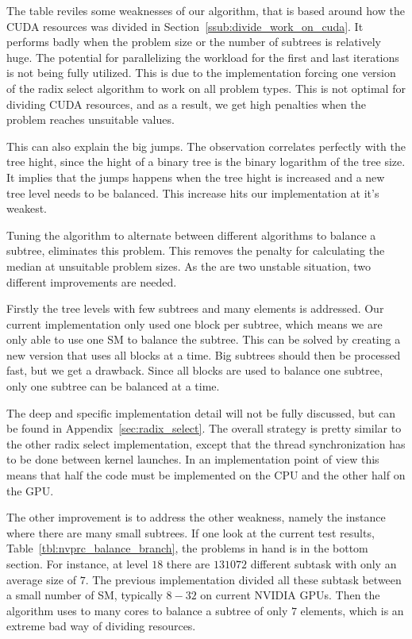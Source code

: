 The table reviles some weaknesses of our algorithm, that is based around how the CUDA resources was divided in Section~\ref{ssub:divide_work_on_cuda}. It performs badly when the problem size or the number of subtrees is relatively huge. The potential for parallelizing the workload for the first and last iterations is not being fully utilized. This is due to the implementation forcing one version of the radix select algorithm to work on all problem types. This is not optimal for dividing CUDA resources, and as a result, we get high penalties when the problem reaches unsuitable values.

This can also explain the big jumps. The observation correlates perfectly with the tree hight, since the hight of a binary tree is the binary logarithm of the tree size. It implies that the jumps happens when the tree hight is increased and a new tree level needs to be balanced. This increase hits our implementation at it's weakest.

Tuning the algorithm to alternate between different algorithms to balance a subtree, eliminates this problem. This removes the penalty for calculating the median at unsuitable problem sizes. As the are two unstable situation, two different improvements are needed.

Firstly the tree levels with few subtrees and many elements is addressed. Our current implementation only used one block per subtree, which means we are only able to use one SM to balance the subtree. This can be solved by creating a new version that uses all blocks at a time. Big subtrees should then be processed fast, but we get a drawback. Since all blocks are used to balance one subtree, only one subtree can be balanced at a time.

The deep and specific implementation detail will not be fully discussed, but can be found in Appendix~\ref{sec:radix_select}. The overall strategy is pretty similar to the other radix select implementation, except that the thread synchronization has to be done between kernel launches. In an implementation point of view this means that half the code must be implemented on the CPU and the other half on the GPU\@.

The other improvement is to address the other weakness, namely the instance where there are many small subtrees. If one look at the current test results,  Table~\ref{tbl:nvprc_balance_branch}, the problems in hand is in the bottom section. For instance, at level $18$ there are $131072$ different subtask with only an average size of $7$. The previous implementation divided all these subtask between a small number of SM, typically $8-32$ on current NVIDIA GPUs\@. Then the algorithm uses to many cores to balance a subtree of only $7$ elements, which is an extreme bad way of dividing resources.

